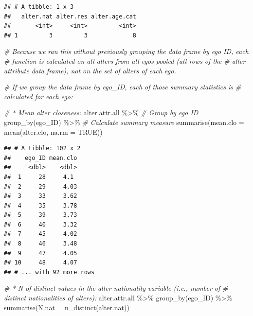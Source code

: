 \documentclass[
]{book}
\newenvironment{Shaded}{\begin{snugshade}}{\end{snugshade}}
\newcommand{\AttributeTok}[1]{\textcolor[rgb]{0.77,0.63,0.00}{#1}}
\newcommand{\CommentTok}[1]{\textcolor[rgb]{0.56,0.35,0.01}{\textit{#1}}}
\newcommand{\ConstantTok}[1]{\textcolor[rgb]{0.00,0.00,0.00}{#1}}
\newcommand{\FunctionTok}[1]{\textcolor[rgb]{0.00,0.00,0.00}{#1}}
\newcommand{\NormalTok}[1]{#1}
\newcommand{\SpecialCharTok}[1]{\textcolor[rgb]{0.00,0.00,0.00}{#1}}
\begin{document}
\begin{verbatim}
## # A tibble: 1 x 3
##   alter.nat alter.res alter.age.cat
##       <int>     <int>         <int>
## 1         3         3             8
\end{verbatim}

\begin{Shaded}
\begin{Highlighting}[]
\CommentTok{\# Because we ran this without previously grouping the data frame by ego ID, each}
\CommentTok{\# function is calculated on all alters from all egos pooled (all rows of the}
\CommentTok{\# alter attribute data frame), not on the set of alters of each ego.}

\CommentTok{\# If we group the data frame by ego\_ID, each of those summary statistics is}
\CommentTok{\# calculated for each ego:}

\CommentTok{\# * Mean alter closeness:}
\NormalTok{alter.attr.all }\SpecialCharTok{\%\textgreater{}\%}
  \CommentTok{\# Group by ego ID}
  \FunctionTok{group\_by}\NormalTok{(ego\_ID) }\SpecialCharTok{\%\textgreater{}\%}
  \CommentTok{\# Calculate summary measure}
  \FunctionTok{summarise}\NormalTok{(}\AttributeTok{mean.clo =} \FunctionTok{mean}\NormalTok{(alter.clo, }\AttributeTok{na.rm =} \ConstantTok{TRUE}\NormalTok{))}
\end{Highlighting}
\end{Shaded}

\begin{verbatim}
## # A tibble: 102 x 2
##    ego_ID mean.clo
##     <dbl>    <dbl>
##  1     28     4.1 
##  2     29     4.03
##  3     33     3.62
##  4     35     3.78
##  5     39     3.73
##  6     40     3.32
##  7     45     4.02
##  8     46     3.48
##  9     47     4.05
## 10     48     4.07
## # ... with 92 more rows
\end{verbatim}

\begin{Shaded}
\begin{Highlighting}[]
\CommentTok{\# * N of distinct values in the alter nationality variable (i.e., number of }
\CommentTok{\# distinct nationalities of alters):}
\NormalTok{alter.attr.all }\SpecialCharTok{\%\textgreater{}\%}
  \FunctionTok{group\_by}\NormalTok{(ego\_ID) }\SpecialCharTok{\%\textgreater{}\%}
  \FunctionTok{summarise}\NormalTok{(}\AttributeTok{N.nat =} \FunctionTok{n\_distinct}\NormalTok{(alter.nat))}
\end{Highlighting}
\end{Shaded}
\end{document}
